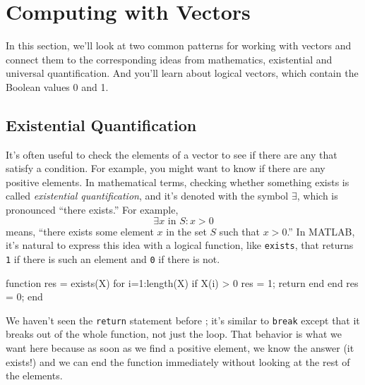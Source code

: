 


\section{Computing with Vectors}

In this section, we'll look at two common patterns for working with vectors and connect them to the corresponding ideas from mathematics, existential and universal quantification.  And you'll learn about logical vectors, which contain the Boolean values 0 and 1. 

\subsection{Existential Quantification}


It's often useful to check the elements of a vector to see if there
are any that satisfy a condition.  For example, you might want to
know if there are any positive elements.  In mathematical terms, checking whether something exists is called \emph{existential quantification}, and it's denoted with
the symbol $\exists$, which is pronounced ``there exists.''  For example,
%
\[ \exists x \mbox{~in~} S: x>0  \]
%
means, ``there exists some element $x$ in the set $S$ such that
$x>0$.''  In MATLAB, it's natural to express this idea with a logical
function, like \lstinline{exists}, that returns \lstinline{1} if there is such an
element and \lstinline{0} if there is not.

\begin{code}
function res = exists(X)
    for i=1:length(X)
        if X(i) > 0
            res = 1;
            return
        end
    end
    res = 0;
end
\end{code}

We haven't seen the \lstinline{return} statement before ; it's similar
to \lstinline{break} except that it breaks out of the whole function, not
just the loop.  That behavior is what we want here because as soon
as we find a positive element, we know the answer (it exists!) and
we can end the function immediately without looking at the rest
of the elements.

